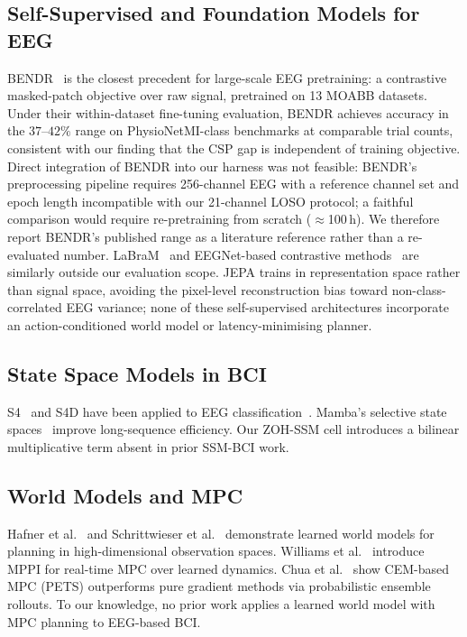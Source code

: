 \documentclass[journal]{IEEEtran}
\begin{document}
\subsection{Self-Supervised and Foundation Models for EEG}
BENDR~\cite{kostas2022bendr} is the closest precedent for large-scale EEG pretraining: a contrastive masked-patch objective over raw signal, pretrained on 13 MOABB datasets.
Under their within-dataset fine-tuning evaluation, BENDR achieves accuracy in the $37$--$42\%$ range on PhysioNetMI-class benchmarks at comparable trial counts, consistent with our finding that the CSP gap is independent of training objective.
Direct integration of BENDR into our harness was not feasible: BENDR's preprocessing pipeline requires 256-channel EEG with a reference channel set and epoch length incompatible with our 21-channel LOSO protocol; a faithful comparison would require re-pretraining from scratch ($\approx$100\,h).
We therefore report BENDR's published range as a literature reference rather than a re-evaluated number.
LaBraM~\cite{jiang2024large} and EEGNet-based contrastive methods~\cite{mohsenvand2020contrastive} are similarly outside our evaluation scope.
JEPA trains in representation space rather than signal space, avoiding the pixel-level reconstruction bias toward non-class-correlated EEG variance; none of these self-supervised architectures incorporate an action-conditioned world model or latency-minimising planner.

\subsection{State Space Models in BCI}
S4~\cite{gu2022efficiently} and S4D have been applied to EEG classification~\cite{yi2022s4eeg}.
Mamba's selective state spaces~\cite{gu2023mamba} improve long-sequence efficiency.
Our ZOH-SSM cell introduces a bilinear multiplicative term absent in prior SSM-BCI work.

\subsection{World Models and MPC}
Hafner et al.~\cite{hafner2020dreamer} and Schrittwieser et al.~\cite{schrittwieser2020muzero} demonstrate learned world models for planning in high-dimensional observation spaces.
Williams et al.~\cite{williams2017information} introduce MPPI for real-time MPC over learned dynamics.
Chua et al.~\cite{chua2018deep} show CEM-based MPC (PETS) outperforms pure gradient methods via probabilistic ensemble rollouts.
To our knowledge, no prior work applies a learned world model with MPC planning to EEG-based BCI.
\end{document}
